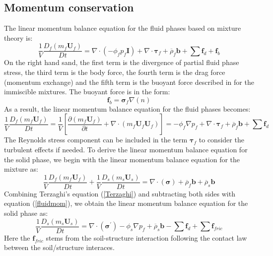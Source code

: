 \documentclass[preprint,12pt]{elsarticle}
\begin{document}
\subsection{\textsf{Momentum conservation}}
\label{Momentum}
%
%
The linear momentum balance equation for the fluid phases based on mixture theory is:\\
%
%
\begin{equation}
    \frac{1}{V}\frac{D_f(m_f \pmb{U}_f)}{Dt} = 
    \nabla \cdot (-\phi_f p_f\pmb{I}) + \nabla \cdot \pmb{\tau}_f + \overline{\rho}_f \pmb{b} +  \sum \pmb{f}_{d} + \pmb{f}_b
\end {equation}
%
%
On the right hand sand, the first term is the divergence of partial fluid phase stress, the third term is the body force, the fourth term is the drag force (momentum exchange) and the fifth term is the buoyant force described in \cite{DRUMHELLER} for the immiscible mixtures. The buoyant force is in the form:\\
%
%
\begin{equation}
    \pmb{f}_b = \pmb{\sigma}_f\nabla (n)
\end {equation}
%
%
As a result, the linear momentum balance equation for the fluid phases becomes:
%
%
\begin{equation}
    \label{fluidmom}
     \frac{1}{V}\frac{D_f(m_f \pmb{U}_f)}{Dt} =  \frac{1}{V} \left[ \frac{\partial (m_f \pmb{U}_f)}{\partial t} + \nabla \cdot  (m_f \pmb{U}_f \pmb{U}_f) \right] = -\phi_f \nabla p_f + \nabla \cdot \pmb{\tau}_f +  \overline{\rho}_f \pmb{b} +  \sum  \pmb{f}_{d}
\end {equation}
%
%
The Reynolds stress component can be included in the term $\pmb{\tau}_f$ to consider the turbulent effects if needed. To derive the linear momentum balance equation for the solid phase, we begin with the linear momentum balance equation for the mixture as:
%
%
\begin{equation}
    \label{totalmom}
     \frac{1}{V}\frac{D_f(m_f \pmb{U}_f)}{Dt}
    +  \frac{1}{V}\frac{D_s(m_s \pmb{U}_s)}{Dt} = 
    \nabla \cdot (\pmb{\sigma}) + \overline{\rho}_f \pmb{b} 
    + \overline{\rho}_s \pmb{b}
\end {equation}
%
%
Combining Terzaghi's equation (\ref{Terzaghi}) and subtracting both sides with equation (\ref{fluidmom}), we obtain the linear momentum balance equation for the solid phase as:
%
%
\begin{equation}
    \label{solidmom}
     \frac{1}{V}\frac{D_s(m_s \pmb{U}_s)}{Dt} = 
    \nabla \cdot (\pmb{\sigma}^\prime) - \phi_s \nabla p_f 
    + \overline{\rho}_s \pmb{b}   -  \sum \pmb{f}_{d} +  \sum \pmb{f}_{fric}
\end {equation}
%
%
Here the $\pmb{f}_{fric}$ stems from the soil-structure interaction following the contact law between the soil/structure interaces.
\end{document}
